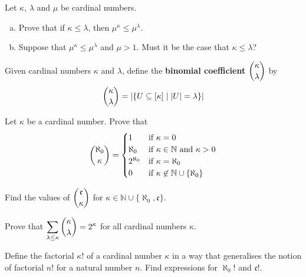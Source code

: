 \begin{chapex}
Let $\kappa$, $\lambda$ and $\mu$ be cardinal numbers.
\begin{enumerate}[(a)]
\item Prove that if $\kappa \le \lambda$, then $\mu^{\kappa} \le \mu^{\lambda}$.
\item Suppose that $\mu^{\kappa} \le \mu^{\lambda}$ and $\mu > 1$. Must it be the case that $\kappa \le \lambda$?
\end{enumerate}
\end{chapex}

\begin{definition}
Given cardinal numbers $\kappa$ and $\lambda$, define the \textbf{binomial coefficient} $\dbinom{\kappa}{\lambda}$ by
\[ \dbinom{\kappa}{\lambda} = |\{ U \subseteq [\kappa] \mid |U| = \lambda \}| \]
\end{definition}

\begin{chapex}
Let $\kappa$ be a cardinal number. Prove that
\[ \dbinom{\aleph_0}{\kappa} = \begin{cases} 1 & \text{if } \kappa = 0 \\ \aleph_0 & \text{if } \kappa \in \mathbb{N} \text{ and } \kappa > 0 \\ 2^{\aleph_0} & \text{if } \kappa = \aleph_0 \\ 0 & \text{if } \kappa \not\in \mathbb{N} \cup \{ \aleph_0 \} \end{cases} \]
\end{chapex}

\begin{chapex}
Find the values of $\dbinom{\mathfrak{c}}{\kappa}$ for $\kappa \in \mathbb{N} \cup \{ \aleph_0, \mathfrak{c} \}$.
\end{chapex}

\begin{chapex}
Prove that $\displaystyle \sum_{\lambda \le \kappa} \dbinom{\kappa}{\lambda} = 2^{\kappa}$ for all cardinal numbers $\kappa$.
\end{chapex}

\begin{chapex}
Define the factorial $\kappa !$ of a cardinal number $\kappa$ in a way that generalises the notion of factorial $n!$ for a natural number $n$. Find expressions for $\aleph_0!$ and $\mathfrak{c}!$.
\end{chapex}